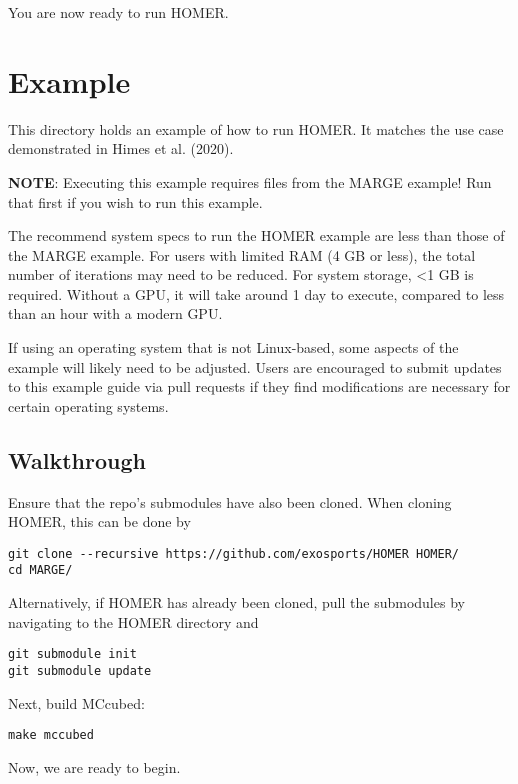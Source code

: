 \documentclass[letterpaper, 12pt]{article}
\begin{document}
\noindent You are now ready to run HOMER.


\section{Example}
\label{sec:example}

This directory holds an example of how to run HOMER. It matches the use case 
demonstrated in Himes et al. (2020).

\noindent \textbf{NOTE}: Executing this example requires files from the 
MARGE example!  Run that first if you wish to run this example.\newline

\noindent The recommend system specs to run the HOMER example are less than 
those of the MARGE example.  For users with limited RAM (4 GB or less), the 
total number of iterations may need to be reduced.  For system storage, 
{\textless}1 GB is required.  Without a GPU, it will take around 1 day 
to execute, compared to less than an hour with a modern GPU.\newline

\noindent If using an operating system that is not Linux-based, some aspects of 
the example will likely need to be adjusted.  Users are encouraged to submit 
updates to this example guide via pull requests if they find modifications are 
necessary for certain operating systems.


\subsection{Walkthrough}

Ensure that the repo's submodules have also been cloned.  
When cloning HOMER, this can be done by
\begin{verbatim}
git clone --recursive https://github.com/exosports/HOMER HOMER/
cd MARGE/
\end{verbatim}
Alternatively, if HOMER has already been cloned, pull the submodules by 
navigating to the HOMER directory and 
\begin{verbatim}
git submodule init
git submodule update
\end{verbatim}

\noindent Next, build MCcubed:
\begin{verbatim}
make mccubed
\end{verbatim}

\noindent Now, we are ready to begin.\newline
\end{document}
